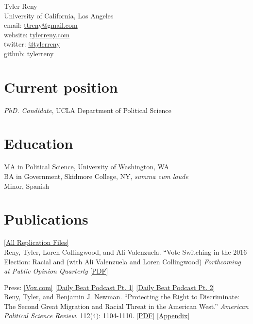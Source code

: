 \documentclass[11pt, a4paper]{article}
\newcommand{\years}[1]{\marginnote{\scriptsize #1}}
\begin{document}
{\LARGE Tyler Reny}\\[1cm]
 University of California, Los Angeles\\
email: \href{mailto:ttreny@gmail.com}{ttreny@gmail.com}\\
website: \href{http://www.tylerreny.com}{tylerreny.com}\\ 
twitter: \href{http://www.twitter.com/tylerreny}{@tylerreny}\\ 
github: \href{https://github.com/tylerreny}{tylerreny}\\ 

\section*{Current position}
\emph{PhD. Candidate}, UCLA Department of Political Science

\section*{Education}
\years{2015}\textsc{MA} in Political Science, University of Washington, WA\\
\years{2011}\textsc{BA} in Government, Skidmore College, NY, \textit{summa cum laude}\\
Minor, Spanish

\section*{Publications}
\href{https://dataverse.harvard.edu/dataverse/tylerreny}{[All Replication Files]}\\

\years{2018} Reny, Tyler, Loren Collingwood, and Ali Valenzuela. ``Vote Switching in the 2016 Election: Racial and (with Ali Valenzuela and Loren Collingwood) \textit{Forthcoming at Public Opinion Quarterly} \href{http://tylerreny.github.io/pdf/pubs/final_submission_reny_etal_poq_public.pdf}{[PDF]} 

Press: \href{https://www.vox.com/policy-and-politics/2018/10/16/17980820/trump-obama-2016-race-racism-class-economy-2018-midterm}{[Vox.com]} \href{http://www.btrtoday.com/listen/thedailybeat/vote-switching-in-the-2016-election-with-tyler-reny-part-1/}{[Daily Beat Podcast Pt. 1]} \href{http://www.btrtoday.com/listen/thedailybeat/vote-switching-white-economic-anxiety-more-with-tyler-reny-part2/}{[Daily Beat Podcast Pt. 2]}\\

\years{} Reny, Tyler, and Benjamin J. Newman. ``Protecting the Right to Discriminate: The Second Great Migration and Racial Threat in the American West.'' \textit{American Political Science Review.} 112(4): 1104-1110. \href{http://tylerreny.github.io/pdf/pubs/reny_newman_apsr_2018.pdf}{[PDF]} \href{http://tylerreny.github.io/pdf/pubs/reny_newman_apsr_2018_SI.pdf}{[Appendix]}\\
\end{document}
